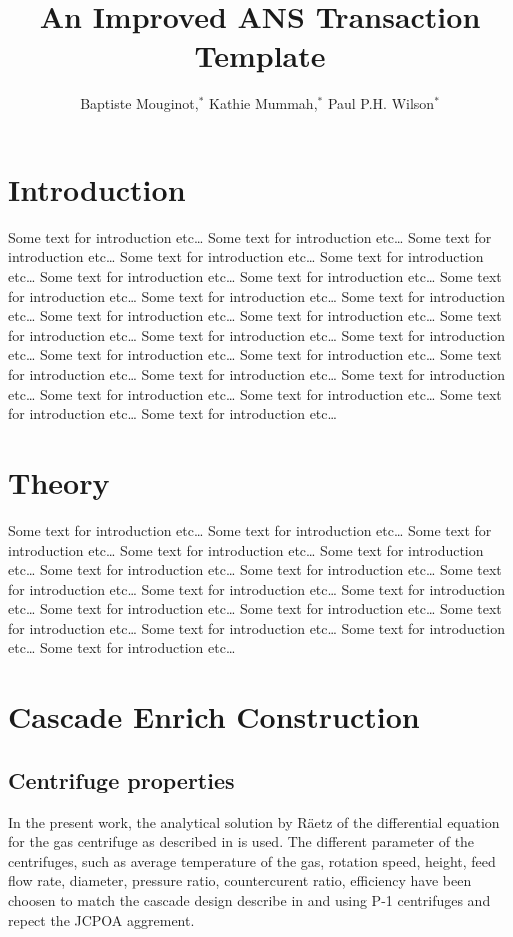 \documentclass{anstrans}
\title{An Improved ANS Transaction Template}
\author{Baptiste Mouginot,$^{*}$ Kathie Mummah,$^{*}$ Paul P.H. Wilson$^{*}$}
\institute{
$^{*}$University of Wisconsin-Madison, WI
}
\begin{document}
\section{Introduction}




Some text for introduction etc\ldots
Some text for introduction etc\ldots
Some text for introduction etc\ldots
Some text for introduction etc\ldots
Some text for introduction etc\ldots
Some text for introduction etc\ldots
Some text for introduction etc\ldots
Some text for introduction etc\ldots
Some text for introduction etc\ldots
Some text for introduction etc\ldots
Some text for introduction etc\ldots
Some text for introduction etc\ldots
Some text for introduction etc\ldots
Some text for introduction etc\ldots
Some text for introduction etc\ldots
Some text for introduction etc\ldots
Some text for introduction etc\ldots
Some text for introduction etc\ldots
Some text for introduction etc\ldots
Some text for introduction etc\ldots
Some text for introduction etc\ldots
Some text for introduction etc\ldots
Some text for introduction etc\ldots
Some text for introduction etc\ldots


\section{Theory}



Some text for introduction etc\ldots
Some text for introduction etc\ldots
Some text for introduction etc\ldots
Some text for introduction etc\ldots
Some text for introduction etc\ldots
Some text for introduction etc\ldots
Some text for introduction etc\ldots
Some text for introduction etc\ldots
Some text for introduction etc\ldots
Some text for introduction etc\ldots
Some text for introduction etc\ldots
Some text for introduction etc\ldots
Some text for introduction etc\ldots
Some text for introduction etc\ldots
Some text for introduction etc\ldots
Some text for introduction etc\ldots


\section{Cascade Enrich Construction}
\subsection{Centrifuge properties}
In the present work, the analytical solution by R\"aetz \cite{ref} of the
differential equation for the gas centrifuge as described in \cite{Glaser2008}
is used. The different parameter of the centrifuges, such as average temperature
of the gas, rotation speed, height, feed flow rate, diameter, pressure ratio,
countercurent ratio, efficiency have been choosen to match the cascade design
describe in \cite{glaser2008} and \cite{Walker2017} using P-1 centrifuges and
repect the JCPOA aggrement.
\end{document}
